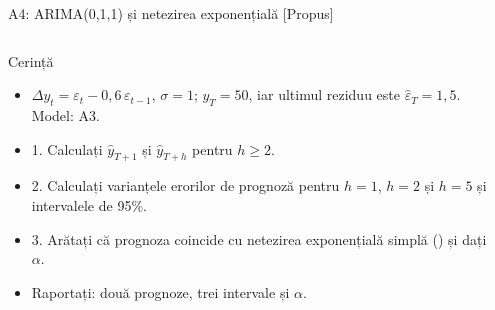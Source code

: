 \begin{frame}{A4: ARIMA(0,1,1) și netezirea exponențială [Propus]}
\propsub
\itemsize{\scriptsize}
\begin{columns}[T]
\begin{column}{\taskw}
\begin{block}{Cerință}
\begin{itemize}
    \item $\Delta y_t = \varepsilon_t - 0{,}6\,\varepsilon_{t-1}$, $\sigma = 1$; $y_T = 50$, iar ultimul reziduu este $\hat\varepsilon_T = 1{,}5$. Model: A3.
    \item 1. Calculați $\hat y_{T+1}$ și $\hat y_{T+h}$ pentru $h \ge 2$.
    \item 2. Calculați varianțele erorilor de prognoză pentru $h = 1$, $h = 2$ și $h = 5$ și intervalele de 95\%.
    \item 3. Arătați că prognoza coincide cu netezirea exponențială simplă () și dați $\alpha$.
    \item Raportați: două prognoze, trei intervale și $\alpha$.
\end{itemize}
\end{block}
\end{column}
\begin{column}{\solw}
\end{column}
\end{columns}
\end{frame}

